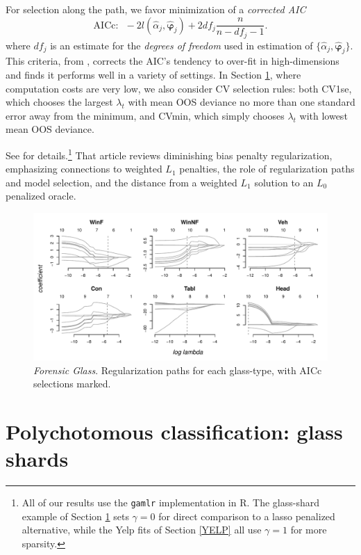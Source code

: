 \documentclass[12pt]{article}
\newcommand{\bs}[1]{\boldsymbol{#1}}
\begin{document}
For selection along the path, we
favor minimization of a {\it corrected AIC}
\begin{equation}
\text{AICc:}~~~-2l(\hat\alpha_j,\bs{\hat\varphi}_j) + 2df_j\frac{n}{n-df_j-1}.
\end{equation}
where $df_j$ is an estimate for the {\it degrees of freedom} used in estimation
of $\{\hat\alpha_j,\bs{\hat\varphi}_j\}$.  This criteria, from
\cite{hurvich_regression_1989}, corrects the AIC's tendency to over-fit in
high-dimensions and \cite{taddy_gamma_2013} finds it performs well in a variety
of settings.  In Section \ref{FGL}, where computation costs are very low, we
also consider CV selection rules: both CV1se, which chooses the largest
$\lambda_t$ with mean OOS deviance no more than one standard error away from
the minimum, and CVmin, which simply chooses $\lambda_t$ with lowest mean
OOS deviance.

See \cite{taddy_gamma_2013} for details.\footnote{All of our results use the
{\tt gamlr} implementation in R.  The glass-shard example of Section \ref{FGL}
sets $\gamma=0$ for direct comparison to a lasso penalized alternative, while
the Yelp fits of Section \ref{YELP} all use $\gamma=1$ for more sparsity.}
That article reviews diminishing bias penalty regularization, emphasizing
connections to weighted $L_1$ penalties, the role of regularization paths and
model selection, and the distance from a weighted $L_1$ solution to an $L_0$
penalized oracle.


\begin{figure}[ht!]
\includegraphics[width=6.25in]{../graphs/fgl_coef}
\caption{\label{fgl_coef} {\it Forensic Glass}. Regularization paths for each glass-type, with AICc selections marked.}
\end{figure}

\section{Polychotomous classification: glass shards}
\label{FGL}
\end{document}
